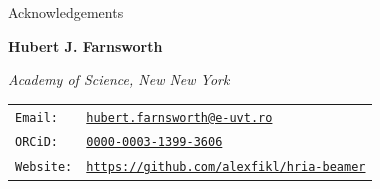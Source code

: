 \documentclass[aspectratio=169]{beamer}
\begin{document}
\begin{frame}{Acknowledgements}
\vfill
\centering

\begin{quote}
\inserthriafunding
\end{quote}

\bigskip
\inserthriaqrcode

\medskip
\Large
\href{\inserthriaurl}{\textbf{\texttt{\inserthriaurl}}}
\vfill
\end{frame}

\begin{frame}{}
\vfill
\begin{center}
{\Large \textbf{Hubert J. Farnsworth} }

\textit{Academy of Science, New New York}

\bigskip

\begin{tabular}{ll}
\texttt{Email:} &
    \href{mailto:hubert.farnsworth@e-uvt.ro}{\texttt{hubert.farnsworth@e-uvt.ro}} \\
\texttt{ORCiD:} &
    \href{https://orcid.org/0000-0003-1399-3606}{\texttt{0000-0003-1399-3606}} \\
\texttt{Website:} &
    \href{https://github.com/alexfikl/hria-beamer}{\texttt{https://github.com/alexfikl/hria-beamer}}
\end{tabular}
\end{center}
\vfill
\end{frame}
\end{document}
